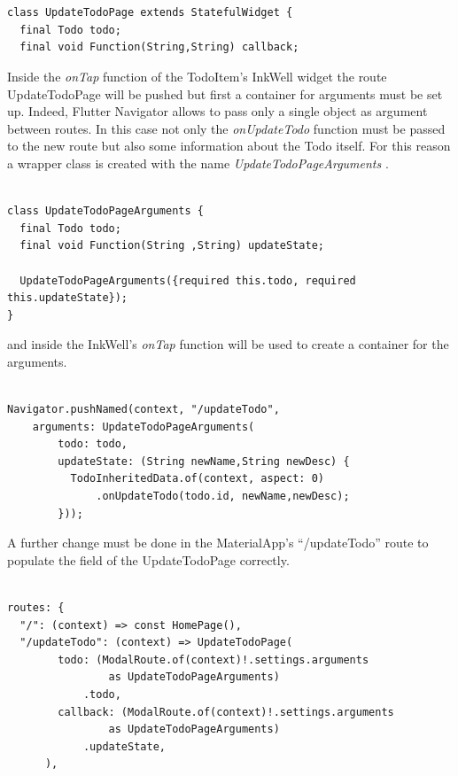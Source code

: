 \mbox{}\\


\begin{verbatim}

class UpdateTodoPage extends StatefulWidget {
  final Todo todo;
  final void Function(String,String) callback;
 \end{verbatim}
 

Inside the \textit{onTap }function of the TodoItem's InkWell widget the route UpdateTodoPage will be pushed but first a container for arguments must be set up. Indeed, Flutter Navigator allows to pass only a single object as argument between routes. In this case not only the \textit{onUpdateTodo} function must be passed to the new route but also some information about the Todo itself. For this reason a wrapper class is created with the name \textit{UpdateTodoPageArguments }.
\mbox{}\\


\begin{verbatim}

class UpdateTodoPageArguments {
  final Todo todo;
  final void Function(String ,String) updateState;

  UpdateTodoPageArguments({required this.todo, required this.updateState});
}
\end{verbatim}

and inside the InkWell’s \textit{onTap }function will be used to create a container for the arguments.
\mbox{}\\


\begin{verbatim}

Navigator.pushNamed(context, "/updateTodo",
    arguments: UpdateTodoPageArguments(
        todo: todo,
        updateState: (String newName,String newDesc) {
          TodoInheritedData.of(context, aspect: 0)
              .onUpdateTodo(todo.id, newName,newDesc);
        }));
\end{verbatim}

A further change must be done in the MaterialApp’s  “/updateTodo” route to populate the field of the UpdateTodoPage correctly.
\mbox{}\\


\begin{verbatim}

routes: {
  "/": (context) => const HomePage(),
  "/updateTodo": (context) => UpdateTodoPage(
        todo: (ModalRoute.of(context)!.settings.arguments
                as UpdateTodoPageArguments)
            .todo,
        callback: (ModalRoute.of(context)!.settings.arguments
                as UpdateTodoPageArguments)
            .updateState,
      ),
\end{verbatim}

